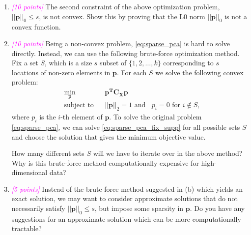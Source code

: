 \documentclass{exam}
\newcommand{\grade}[1]{\small\textcolor{magenta}{\emph{[#1 points]}} \normalsize}
\begin{document}
\begin{enumerate}[label=(\alph*)]

    \item \grade{10} The second constraint of the above optimization problem,  $||\bm{p}||_0 \leq s$,  is not convex. Show this by proving that the L0 norm $||\bm{p}||_0$ is not a convex function.
 
    \newpage
    \item \grade{10} Being a non-convex problem, \eqref{eq:sparse_pca} is hard to solve directly. Instead, we can use the following brute-force optimization method. Fix a set $S$, which is a size $s$ subset of $\{1, 2, \dots, k\}$ corresponding to $s$ locations of non-zero elements in $\bm{p}$. For each $S$ we solve the following convex problem:
    \vspace{-.5em}
     \begin{equation}\label{eq:sparse_pca_fix_supp}
         \begin{aligned}
         & \min_{\bm{p}}
         & & \bm{p^T C_X p} \\
         & \text{subject to}
         & & ||\bm{p}||_2 = 1 \text{ and } \;\; p_i = 0 \text{ for } i \not \in S,
         \end{aligned}
     \end{equation}
    where $p_i$ is the $i$-th element of $\bm{p}$. To solve the original problem \eqref{eq:sparse_pca}, we can solve \eqref{eq:sparse_pca_fix_supp} for all possible sets $S$ and choose the solution that gives the minimum objective value.

    How many different sets $S$ will we have to iterate over in the above method? Why is this brute-force method computationally expensive for high-dimensional data?

   \newpage    
   \item \grade{5} Instead of the brute-force method suggested in (b) which yields an exact solution, we may want to consider approximate solutions that do not necessarily satisfy $||\bm{p}||_0 \leq s$, but impose some sparsity in $\bm{p}$. Do you have any suggestions for an approximate solution which can be more computationally tractable?

\end{enumerate}

\newpage
\end{document}
